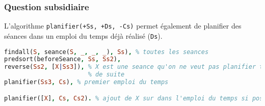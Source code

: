 \subsubsection{Question subsidiaire}

L'algorithme \texttt{planifier(+Ss, +Ds, -Cs)} permet également de planifier des
séances dans un emploi du temps déjà réalisé (\texttt{Ds}).

\begin{lstlisting}[language=Prolog, caption=Exemple d'ajout dans un EDT, captionpos=b,
label={lst:creneauValideCreneau}]
findall(S, seance(S, _, _, _), Ss), % toutes les seances
predsort(beforeSeance, Ss, Ss2),
reverse(Ss2, [X|Ss3]), % X est une seance qu'on ne veut pas planifier tout
                       % de suite
planifier(Ss3, Cs), % premier emploi du temps

planifier([X], Cs, Cs2). % ajout de X sur dans l'emploi du temps si possible
\end{lstlisting}

